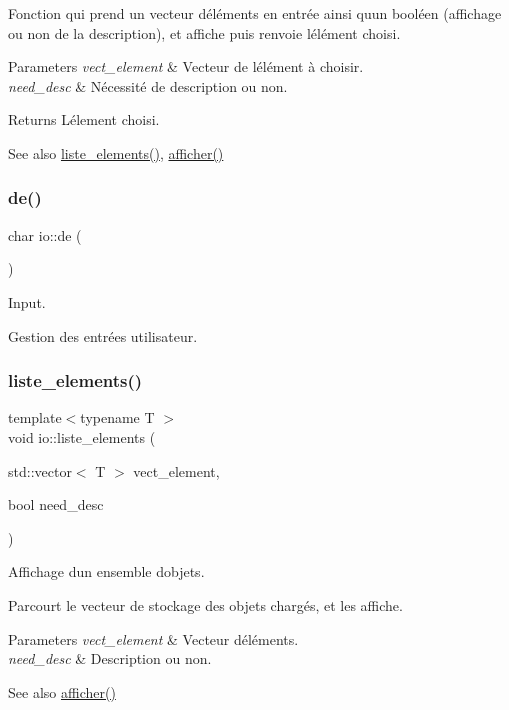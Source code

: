 Fonction qui prend un vecteur d\textquotesingle{}éléments en entrée ainsi qu\textquotesingle{}un booléen (affichage ou non de la description), et affiche puis renvoie l\textquotesingle{}élément choisi. 
\begin{DoxyParams}{Parameters}
{\em vect\+\_\+element} & Vecteur de l\textquotesingle{}élément à choisir. \\
\hline
{\em need\+\_\+desc} & Nécessité de description ou non. \\
\hline
\end{DoxyParams}
\begin{DoxyReturn}{Returns}
L\textquotesingle{}élement choisi. 
\end{DoxyReturn}
\begin{DoxySeeAlso}{See also}
\hyperlink{namespaceio_a0518bc32f1debefc2630431cd0c22cb0}{liste\+\_\+elements()}, \hyperlink{namespaceio_a0e3593d732c42572e8b3cb09ad21c4c9}{afficher()} 
\end{DoxySeeAlso}
\mbox{\label{namespaceio_ae9908b55f26f07e78043d7cfad003d22}} 
\subsubsection{\texorpdfstring{de()}{de()}}
{\footnotesize\ttfamily char io\+::de (\begin{DoxyParamCaption}{ }\end{DoxyParamCaption})}



Input. 

Gestion des entrées utilisateur. \mbox{\label{namespaceio_a0518bc32f1debefc2630431cd0c22cb0}} 
\subsubsection{\texorpdfstring{liste\+\_\+elements()}{liste\_elements()}}
{\footnotesize\ttfamily template$<$typename T $>$ \\
void io\+::liste\+\_\+elements (\begin{DoxyParamCaption}\item[{std\+::vector$<$ T $>$}]{vect\+\_\+element,  }\item[{bool}]{need\+\_\+desc }\end{DoxyParamCaption})}



Affichage d\textquotesingle{}un ensemble d\textquotesingle{}objets. 

Parcourt le vecteur de stockage des objets chargés, et les affiche. 
\begin{DoxyParams}{Parameters}
{\em vect\+\_\+element} & Vecteur d\textquotesingle{}éléments. \\
\hline
{\em need\+\_\+desc} & Description ou non. \\
\hline
\end{DoxyParams}
\begin{DoxySeeAlso}{See also}
\hyperlink{namespaceio_a0e3593d732c42572e8b3cb09ad21c4c9}{afficher()} 
\end{DoxySeeAlso}
